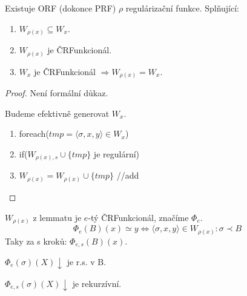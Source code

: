 \begin{lemma}\label{reg_func}
	Existuje ORF (dokonce PRF) $\rho$ regulárizační funkce.
	Splňující:
	\begin{enumerate}
		\item $W_{\rho(x)} \subseteq W_x$.
		\item $W_{\rho(x)}$ je ČRFunkcionál.
		\item $W_x$ je ČRFunkcionál $\Rightarrow W_{\rho(x)} = W_x$.
	\end{enumerate}
\end{lemma}
\begin{proof}
	Není formální důkaz.

	Budeme efektivně generovat $W_x$.

	\begin{enumerate}
		\item foreach($tmp = \langle \sigma, x, y \rangle \in W_x$)
		\item \tab if($W_{\rho(x), s} \cup \{tmp\}$ je regulární)
		\item \tab \tab $W_{\rho(x)} = W_{\rho(x)} \cup \{tmp\}$ //add
	\end{enumerate}
\end{proof}

\begin{definition}
	$W_{\rho(x)}$ z lemmatu je $e$-tý ČRFunkcionál, značíme $\Phi_e$.
	\[ \Phi_e(B)(x) \simeq y \iff \langle \sigma, x, y \rangle \in W_{\rho(x)}: \sigma \prec B \]
	Taky za s kroků: $\Phi_{e, s}(B)(x)$.
\end{definition}

\begin{observation}
	$\Phi_e(\sigma)(X) \downarrow$ je r.s. v B.
\end{observation}

\begin{observation}
	$\Phi_{e, s}(\sigma)(X) \downarrow$ je rekurzívní.
\end{observation}


